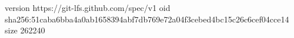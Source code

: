 version https://git-lfs.github.com/spec/v1
oid sha256:51caba6bba4a0ab1658394abf7db769e72a04f3cebed4bc15c26c6cef04cce14
size 262240
